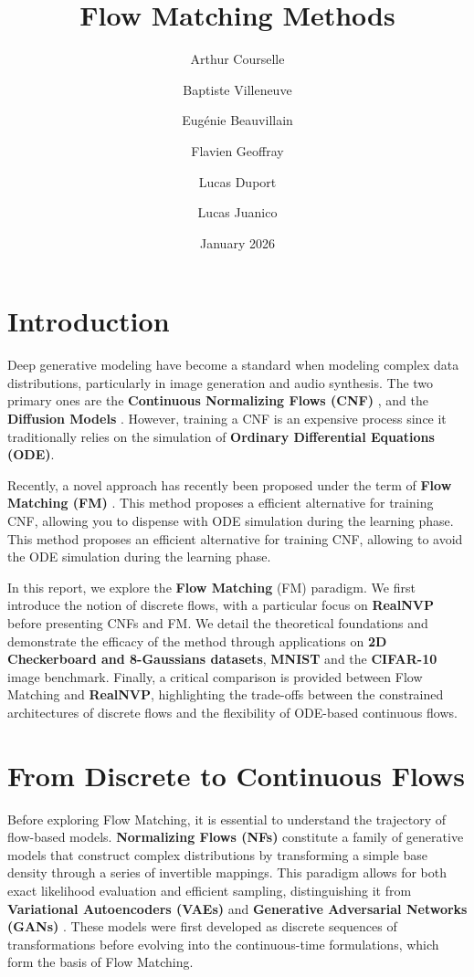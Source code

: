 \documentclass{article}
\title{Flow Matching Methods}
\author{Arthur Courselle \and Baptiste Villeneuve \and Eugénie Beauvillain \and Flavien Geoffray \and Lucas Duport \and Lucas Juanico}
\date{January 2026}
\begin{document}
\maketitle

\section{Introduction}

Deep generative modeling have become a standard when modeling complex data distributions, particularly in image generation and audio synthesis. The two primary ones are the \textbf{Continuous Normalizing Flows (CNF)} \cite{chen2019neuralordinarydifferentialequations}, and the \textbf{Diffusion Models} \cite{ho2020denoisingdiffusionprobabilisticmodels}. However, training a CNF is an expensive process since it traditionally relies on the simulation of \textbf{Ordinary Differential Equations (ODE)}.

Recently, a novel approach has recently been proposed under the term of \textbf{Flow Matching (FM)} \cite{lipman2023flowmatchinggenerativemodeling}. This method proposes a efficient alternative for training CNF, allowing you to dispense with ODE simulation during the learning phase.
This method proposes an efficient alternative for training CNF, allowing to avoid the ODE simulation during the learning phase.

In this report, we explore the \textbf{Flow Matching} (FM) paradigm. We first introduce the notion of discrete flows, with a particular focus on \textbf{RealNVP} \cite{dinh2017densityestimationusingreal} before presenting CNFs and FM. We detail the theoretical foundations and demonstrate the efficacy of the method through applications on \textbf{2D Checkerboard and 8-Gaussians datasets}, \textbf{MNIST} and the \textbf{CIFAR-10} image benchmark. Finally, a critical comparison is provided between Flow Matching and \textbf{RealNVP}, highlighting the trade-offs between the constrained architectures of discrete flows and the flexibility of ODE-based continuous flows.


\section{From Discrete to Continuous Flows}

Before exploring Flow Matching, it is essential to understand the trajectory of flow-based models.
\textbf{Normalizing Flows (NFs)} constitute a family of generative models that construct complex distributions by transforming a simple base density through a series of invertible mappings.
This paradigm allows for both exact likelihood evaluation and efficient sampling, distinguishing it from \textbf{Variational Autoencoders (VAEs)} \cite{kingma2022autoencodingvariationalbayes} and \textbf{Generative Adversarial Networks (GANs)} \cite{goodfellow2014generativeadversarialnetworks}.
These models were first developed as discrete sequences of transformations before evolving into the continuous-time formulations, which form the basis of Flow Matching.
\end{document}
